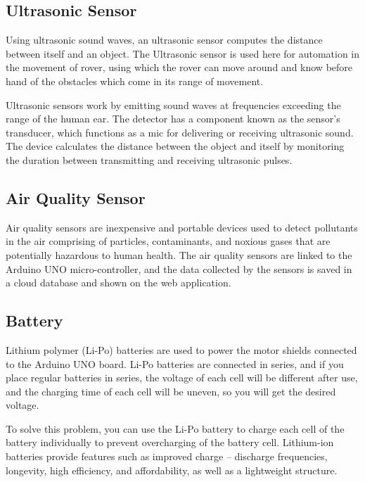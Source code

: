 \documentclass[conference,a4paper]{IEEEtran}
\begin{document}
\subsection{Ultrasonic Sensor}
Using ultrasonic sound waves, an ultrasonic sensor computes the distance between itself and an object. The Ultrasonic sensor is used here for automation in the movement of rover, using which the rover can move around and know before hand of the obstacles which come in its range of movement.\cite{14}

Ultrasonic sensors work by emitting sound waves at frequencies exceeding the range of the human ear. The detector has a component known as the sensor's transducer, which functions as a mic for delivering or receiving ultrasonic sound. The device calculates the distance between the object and itself by monitoring the duration between transmitting and receiving ultrasonic pulses.\cite{15}
\subsection{Air Quality Sensor}
Air quality sensors are inexpensive and portable devices used to detect pollutants in the air comprising of particles, contaminants, and noxious gases that are potentially hazardous to human health. The air quality sensors are linked to the Arduino UNO micro-controller, and the data collected by the sensors is saved in a cloud database and shown on the web application. \cite{16}
\subsection{Battery}
Lithium polymer (Li-Po) batteries are used to power the motor shields connected to the Arduino UNO board. Li-Po batteries are connected in series, and if you place regular batteries in series, the voltage of each cell will be different after use, and the charging time of each cell will be uneven, so you will get the desired voltage.

To solve this problem, you can use the Li-Po battery to charge each cell of the battery individually to prevent overcharging of the battery cell. Lithium-ion batteries provide features such as improved charge – discharge frequencies, longevity, high efficiency, and affordability, as well as a lightweight structure. \cite{19}
\end{document}
